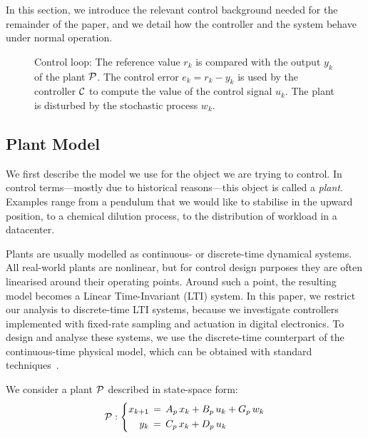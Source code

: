 In this section, we introduce the relevant control background needed for the remainder of the paper, and we detail how the controller and the system behave under normal operation.

\begin{figure}[t]
\centering

\caption{Control loop: The reference value $r_k$ is compared with the output $y_k$ of the plant $\mathcal{P}$.
    The control error $e_k = r_k - y_k$ is used by the controller $\mathcal{C}$ to compute the value of the control signal $u_k$.
    The plant is disturbed by the stochastic process $w_k$.}
\label{fig:loop}
\end{figure}

\subsection{Plant Model}

We first describe the model we use for the object we are trying to control.
In control terms---mostly due to historical reasons---this object is called a \emph{plant}.
Examples range from a pendulum that we would like to stabilise in the upward position, to a chemical dilution process, to the distribution of workload in a datacenter.

Plants are usually modelled as continuous- or discrete-time dynamical systems. 
All real-world plants are nonlinear, but for control design purposes they are often linearised around their operating points.
Around such a point, the resulting model becomes a Linear Time-Invariant (LTI) system.
In this paper, we restrict our analysis to discrete-time LTI systems, because we investigate controllers implemented with fixed-rate sampling and actuation in digital electronics.
To design and analyse these systems, we use the discrete-time counterpart of the continuous-time physical model, which can be obtained with standard techniques~\cite{Astrom:1997}.

We consider a plant $\mathcal{P}$ described in state-space form:
\begin{equation}
\label{eq:background:plant}
    \mathcal{P} : \left\{
    \begin{aligned}
        x_{k+1} &\,=\,  A_p\,x_k + B_p\,u_k + G_p\,w_k \\
        y_k &\,=\, C_p\,x_k + D_p\,u_k
    \end{aligned}
    \right.
\end{equation}

